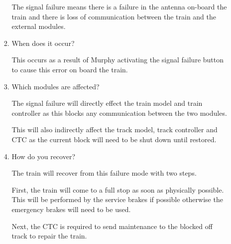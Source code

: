 \documentclass[11pt]{article}
\begin{document}
\begin{enumerate}
\begin{enumerate}
\begin{enumerate}
The signal failure means there is a failure in the antenna on-board the train and there is loss of communication between the train and the external modules.
\item When does it occur?
\label{sec-3-1-4-3-3-2}

This occurs as a result of Murphy activating the signal failure button to cause this error on board the train.
\item Which modules are affected?
\label{sec-3-1-4-3-3-3}

The signal failure will directly effect the train model and train controller as this blocks any communication between the two modules.

This will also indirectly affect the track model, track controller and CTC as the current block will need to be shut down until restored.
\item How do you recover?
\label{sec-3-1-4-3-3-4}

The train will recover from this failure mode with two steps.

First, the train will come to a full stop as soon as physically possible. This will be performed by the service brakes if possible otherwise the emergency brakes will need to be used.

Next, the CTC is required to send maintenance to the blocked off track to repair the train.
\end{enumerate}
\end{enumerate}
\end{enumerate}
\end{document}
